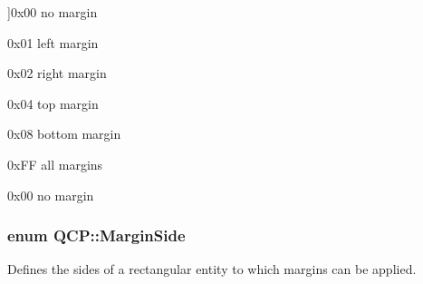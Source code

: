 \begin{Desc}
\begin{description}
{}]{\ttfamily 0x00} no margin \item[{\em 
ms\+Left\hypertarget{namespace_q_c_p_a7e487e3e2ccb62ab7771065bab7cae54a9a47416a401c58f0c6219d17152757a9}{}\label{namespace_q_c_p_a7e487e3e2ccb62ab7771065bab7cae54a9a47416a401c58f0c6219d17152757a9}
}]{\ttfamily 0x01} left margin \item[{\em 
ms\+Right\hypertarget{namespace_q_c_p_a7e487e3e2ccb62ab7771065bab7cae54a75c2181d12e8b8346e2e99e1beb4b694}{}\label{namespace_q_c_p_a7e487e3e2ccb62ab7771065bab7cae54a75c2181d12e8b8346e2e99e1beb4b694}
}]{\ttfamily 0x02} right margin \item[{\em 
ms\+Top\hypertarget{namespace_q_c_p_a7e487e3e2ccb62ab7771065bab7cae54a19acab50954e500a120e251211ff39bf}{}\label{namespace_q_c_p_a7e487e3e2ccb62ab7771065bab7cae54a19acab50954e500a120e251211ff39bf}
}]{\ttfamily 0x04} top margin \item[{\em 
ms\+Bottom\hypertarget{namespace_q_c_p_a7e487e3e2ccb62ab7771065bab7cae54ae0bf0dc064e422ecd13970b6a5f6f0fb}{}\label{namespace_q_c_p_a7e487e3e2ccb62ab7771065bab7cae54ae0bf0dc064e422ecd13970b6a5f6f0fb}
}]{\ttfamily 0x08} bottom margin \item[{\em 
ms\+All\hypertarget{namespace_q_c_p_a7e487e3e2ccb62ab7771065bab7cae54a79334be9c93ef74c6211fee80487945a}{}\label{namespace_q_c_p_a7e487e3e2ccb62ab7771065bab7cae54a79334be9c93ef74c6211fee80487945a}
}]{\ttfamily 0x\+FF} all margins \item[{\em 
ms\+None\hypertarget{namespace_q_c_p_a7e487e3e2ccb62ab7771065bab7cae54a3108d916ac730d3b4ecdfc2911de2595}{}\label{namespace_q_c_p_a7e487e3e2ccb62ab7771065bab7cae54a3108d916ac730d3b4ecdfc2911de2595}
}]{\ttfamily 0x00} no margin \end{description}
\end{Desc}
\subsubsection[{\texorpdfstring{Margin\+Side}{MarginSide}}]{\setlength{\rightskip}{0pt plus 5cm}enum {\bf Q\+C\+P\+::\+Margin\+Side}}\hypertarget{namespace_q_c_p_a7e487e3e2ccb62ab7771065bab7cae54}{}\label{namespace_q_c_p_a7e487e3e2ccb62ab7771065bab7cae54}
Defines the sides of a rectangular entity to which margins can be applied.

